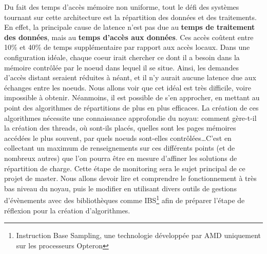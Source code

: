   Du fait des temps d'accès mémoire non uniforme, tout le défi des systèmes
  tournant sur cette architecture est la répartition des données et des
  traitements. En effet, la principale cause de latence n'est pas due au
  \textbf{temps de traitement des données}, mais au \textbf{temps d'accès aux
    données}. Ces accès coûtent entre 10\% et 40\% de temps supplémentaire par
  rapport aux accès locaux.\cite{Lepers2014} Dans une configuration idéale,
  chaque coeur irait chercher ce dont il a besoin dans la mémoire contrôlée par
  le noeud dans lequel il se situe. Ainsi, les demandes d'accès distant seraient
  réduites à néant, et il n'y aurait aucune latence due aux échanges entre les
  noeuds. Nous allons voir que cet idéal est très difficile, voire impossible à
  obtenir. Néanmoins, il est possible de s'en approcher, en mettant au point des
  algorithmes de répartitions de plus en plus efficaces. La création de ces
  algorithmes nécessite une connaissance approfondie du noyau: comment gère-t-il
  la création des threads, où sont-ils placés, quelles sont les pages mémoires
  accédées le plus souvent, par quels noeuds sont-elles contrôlées\ldots C'est
  en collectant un maximum de renseignements sur ces différents points (et de
  nombreux autres) que l'on pourra être en mesure d'affiner les solutions de
  répartition de charge. Cette étape de monitoring sera le sujet principal de ce
  projet de master. Nous allons devoir lire et comprendre le fonctionnement à
  très bas niveau du noyau, puis le modifier en utilisant divers outils de
  gestions d'évènements avec des bibliothèques comme IBS\footnote{Instruction
    Base Sampling, une technologie développée par AMD uniquement sur les
    processeurs Opteron} afin de préparer l'étape de réflexion pour la création
  d'algorithmes.
